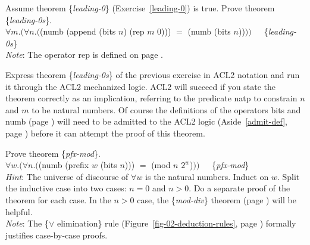 \begin{ExerciseList}
\Exercise \label{leading-0s}
Assume
theorem \{\emph{leading-0}\} (Exercise~\ref{leading-0}) is true.
Prove theorem \{\emph{leading-0s}\}.\\
\hspace*{16mm}$\forall m.(\forall n.($\textsf{(numb (append (bits $n$) (rep $m$ 0)))} $=$
\textsf{(numb (bits $n$))}$))$~~~\{\emph{leading-0s}\}\\
\hspace*{16mm}\emph{Note}: The operator \textsf{rep} is defined on page \pageref{rep-equations}.

\Exercise \label{leading-0s-defthm}
Express theorem \{\emph{leading-0s}\}
of the previous exercise in ACL2 notation
and run it through the ACL2 mechanized logic.
ACL2 will succeed if you state the theorem correctly as an implication,
referring to the predicate \textsf{natp} to constrain $n$ and $m$ to be natural numbers.
Of course the definitions of the operators
\textsf{bits} and \textsf{numb} (page \pageref{bits-defun})
will need to be admitted to the ACL2 logic
(Aside~\ref{admit-def}, page \pageref{admit-def})
before it can attempt the proof of this theorem.

\Exercise \label{pfx-mod}
Prove theorem \{\emph{pfx-mod}\}.\\
\hspace*{16mm}
$\forall w.(\forall n.($\textsf{(numb (prefix $w$ (bits $n$)))} $=$ \textsf{(mod $n$ $2^w$)}$))$~~~\{\emph{pfx-mod}\}\\
\emph{Hint}: The universe of discourse of $\forall w$ is the natural numbers.
Induct on $w$.
Split the inductive case into two cases: $n = 0$ and $n > 0$.
Do a separate proof of the theorem for each case.
In the $n > 0$ case, the \{\emph{mod-div}\} theorem
(page \pageref{modular-division}) will be helpful.\\
\emph{Note}: The \{$\vee$ elimination\} rule
(Figure~\ref{fig-02-deduction-rules}, page \pageref{fig-02-deduction-rules})
formally justifies case-by-case proofs.


\end{ExerciseList}
